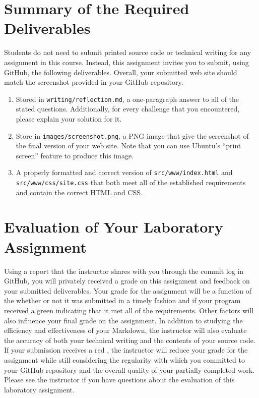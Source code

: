 \documentclass[11pt]{article}
\newcommand{\mainprogramsource}{\lstinline{src/www/index.html}}
\newcommand{\secondprogramsource}{\lstinline{src/www/css/site.css}}
\newcommand{\reflection}{\lstinline{writing/reflection.md}}
\newcommand{\screenshot}{\lstinline{images/screenshot.png}}
\newcommand{\checkmark}{\ding{51}}
\newcommand{\naughtmark}{\ding{55}}
\begin{document}
\section*{Summary of the Required Deliverables}

\noindent Students do not need to submit printed source code or technical
writing for any assignment in this course. Instead, this assignment invites you
to submit, using GitHub, the following deliverables. Overall, your submitted web
site should match the screenshot provided in your GitHub repository.

\vspace*{-.1in}

\begin{enumerate}

  \setlength{\itemsep}{0in}

\item Stored in \reflection{}, a one-paragraph answer to all of the stated
  questions. Additionally, for every challenge that you encountered, please
  explain your solution for it.

\item Store in \screenshot{}, a PNG image that give the screenshot of the final
  version of your web site. Note that you can use Ubuntu's ``print screen''
  feature to produce this image.

\item A properly formatted and correct version of \mainprogramsource{} and
  \secondprogramsource{} that both meet all of the established requirements and
  contain the correct HTML and CSS.

\end{enumerate}

\vspace*{-.15in}

\section*{Evaluation of Your Laboratory Assignment}

Using a report that the instructor shares with you through the commit log in
GitHub, you will privately received a grade on this assignment and feedback on
your submitted deliverables. Your grade for the assignment will be a function of
the whether or not it was submitted in a timely fashion and if your program
received a green \checkmark{} indicating that it met all of the requirements.
Other factors will also influence your final grade on the assignment. In
addition to studying the efficiency and effectiveness of your Markdown, the
instructor will also evaluate the accuracy of both your technical writing and
the contents of your source code. If your submission receives a red
\naughtmark{}, the instructor will reduce your grade for the assignment while
still considering the regularity with which you committed to your GitHub
repository and the overall quality of your partially completed work. Please see
the instructor if you have questions about the evaluation of this laboratory
assignment.
\end{document}
